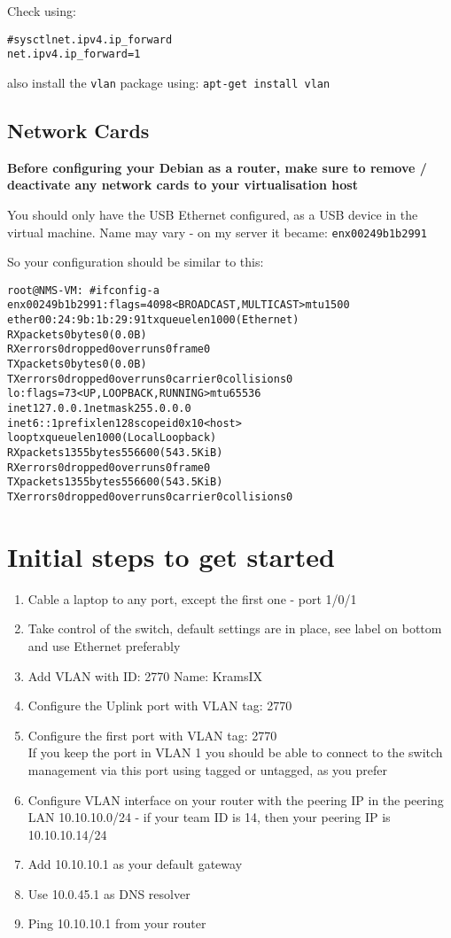 \documentclass[a4paper,11pt,notitlepage]{report}
\begin{document}
Check using:
\begin{alltt}
# sysctl net.ipv4.ip_forward
net.ipv4.ip_forward = 1
\end{alltt}

also install the \verb+vlan+ package using: \verb+apt-get install vlan+


\subsection*{Network Cards}

{\bf Before configuring your Debian as a router, make sure to remove / deactivate any network cards to your virtualisation host}

You should only have the USB Ethernet configured, as a USB device in the virtual machine. Name may vary - on my server it became: \verb+enx00249b1b2991+

So your configuration should be similar to this:
\begin{alltt}
root@NMS-VM:~# ifconfig  -a
enx00249b1b2991: flags=4098<BROADCAST,MULTICAST>  mtu 1500
        ether 00:24:9b:1b:29:91  txqueuelen 1000  (Ethernet)
        RX packets 0  bytes 0 (0.0 B)
        RX errors 0  dropped 0  overruns 0  frame 0
        TX packets 0  bytes 0 (0.0 B)
        TX errors 0  dropped 0 overruns 0  carrier 0  collisions 0
lo: flags=73<UP,LOOPBACK,RUNNING>  mtu 65536
        inet 127.0.0.1  netmask 255.0.0.0
        inet6 ::1  prefixlen 128  scopeid 0x10<host>
        loop  txqueuelen 1000  (Local Loopback)
        RX packets 1355  bytes 556600 (543.5 KiB)
        RX errors 0  dropped 0  overruns 0  frame 0
        TX packets 1355  bytes 556600 (543.5 KiB)
        TX errors 0  dropped 0 overruns 0  carrier 0  collisions 0
\end{alltt}


\section*{Initial steps to get started}
\begin{enumerate}
\item Cable a laptop to any port, except the first one - port 1/0/1
\item Take control of the switch, default settings are in place, see label on bottom and use Ethernet preferably
\item Add VLAN with ID: 2770 Name: KramsIX
\item Configure the Uplink port with VLAN tag: 2770
\item Configure the first port with VLAN tag: 2770\\
If you keep the port in VLAN 1 you should be able to connect to the switch management via this port using tagged or untagged, as you prefer \smiley
\item Configure VLAN interface on your router with the peering IP in the peering LAN 10.10.10.0/24 - if your team ID is 14, then your peering IP is 10.10.10.14/24
\item Add 10.10.10.1 as your default gateway
\item Use 10.0.45.1 as DNS resolver
\item Ping 10.10.10.1 from your router
\end{enumerate}
\end{document}
